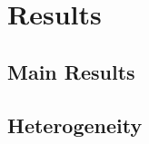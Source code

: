 \section{Results}\label{sec:results}

\subsection{Main Results}\label{sec:main_results}

\subsection{Heterogeneity}\label{sec:heterogeneity}
